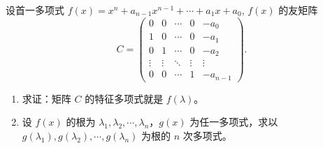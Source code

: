 \documentclass[../../main.tex]{subfiles}%
\begin{document}
\begin{proposition}[友矩阵的特征多项式及特征值]\label{proposition:多项式的友阵的特征多项式与特征值}
设首一多项式 $f(x) = x^n + a_{n-1} x^{n-1} + \cdots + a_1 x + a_0$, $f(x)$ 的友矩阵
\[
C = \begin{pmatrix}
0 & 0 & \cdots & 0 & -a_0 \\
1 & 0 & \cdots & 0 & -a_1 \\
0 & 1 & \cdots & 0 & -a_2 \\
\vdots & \vdots & \ddots & \vdots & \vdots \\
0 & 0 & \cdots & 1 & -a_{n-1}
\end{pmatrix}.
\]
\begin{enumerate}[(1)]
\item 求证：矩阵 $C$ 的特征多项式就是 $f(\lambda)$。

\item 设 $f(x)$ 的根为 $\lambda_1, \lambda_2, \cdots, \lambda_n$，$g(x)$ 为任一多项式，求以 $g(\lambda_1), g(\lambda_2), \cdots, g(\lambda_n)$ 为根的 $n$ 次多项式。 
\end{enumerate}
\end{proposition}
\end{document}
